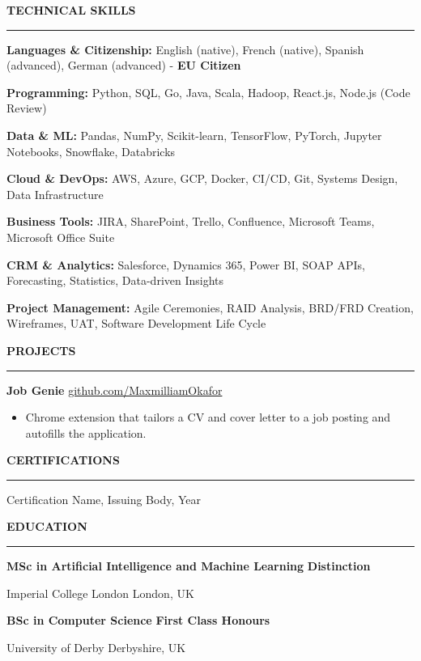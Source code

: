 \documentclass[11pt,a4paper]{article}
\newcommand{\cvsection}[1]{%
  \vspace{7pt}\par
  {\color{navy}\bfseries\large #1}\par
  \vspace{1.5pt}%
  \textcolor{rulecol}{\rule{\textwidth}{0.5pt}}\par
  \vspace{3pt}}
\newcommand{\role}[4]{%
  \vspace{5pt}\par
  {\bfseries #1} \hfill {\color{muted}#2}\par
  {\bfseries #3} \hfill {\color{muted}#4}\par
  \vspace{1pt}}
\begin{document}

\cvsection{TECHNICAL SKILLS}
{\bfseries Languages \& Citizenship:} English (native), French (native), Spanish (advanced), German (advanced) - {\bfseries EU Citizen}\par
{\bfseries Programming:} Python, SQL, Go, Java, Scala, Hadoop, React.js, Node.js (Code Review)\par
{\bfseries Data \& ML:} Pandas, NumPy, Scikit-learn, TensorFlow, PyTorch, Jupyter Notebooks, Snowflake, Databricks\par
{\bfseries Cloud \& DevOps:} AWS, Azure, GCP, Docker, CI/CD, Git, Systems Design, Data Infrastructure\par
{\bfseries Business Tools:} JIRA, SharePoint, Trello, Confluence, Microsoft Teams, Microsoft Office Suite\par
{\bfseries CRM \& Analytics:} Salesforce, Dynamics 365, Power BI, SOAP APIs, Forecasting, Statistics, Data-driven Insights\par
{\bfseries Project Management:} Agile Ceremonies, RAID Analysis, BRD/FRD Creation, Wireframes, UAT, Software Development Life Cycle\par

\cvsection{PROJECTS}
{\bfseries Job Genie} \hfill {\color{muted}\href{https://github.com/MaxmilliamOkafor}{github.com/MaxmilliamOkafor}}\par
\begin{itemize}
  \item Chrome extension that tailors a CV and cover letter to a job posting and autofills the application.
\end{itemize}

\cvsection{CERTIFICATIONS}
Certification Name, Issuing Body, Year\par

\cvsection{EDUCATION}
{\bfseries MSc in Artificial Intelligence and Machine Learning} \hfill {\bfseries Distinction}\par
Imperial College London \hfill {\color{muted}London, UK}\par
\vspace{3pt}
{\bfseries BSc in Computer Science} \hfill {\bfseries First Class Honours}\par
University of Derby \hfill {\color{muted}Derbyshire, UK}\par
\end{document}
